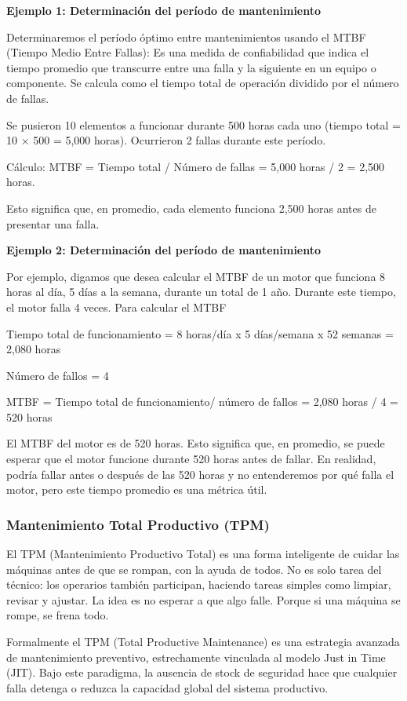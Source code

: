 \documentclass[a4paper,oneside,11pt]{article}
\begin{document}
\begin{enumerate}
    \textbf{Ejemplo 1: Determinación del período de mantenimiento} 
    
    Determinaremos el período óptimo entre mantenimientos usando el MTBF (Tiempo Medio Entre Fallas): Es una medida de confiabilidad que indica el tiempo promedio que transcurre entre una falla y la siguiente en un equipo o componente. Se calcula como el tiempo total de operación dividido por el número de fallas.

    Se pusieron 10 elementos a funcionar durante 500 horas cada uno (tiempo total = 10 × 500 = 5,000 horas). Ocurrieron 2 fallas durante este período.

    Cálculo: MTBF = Tiempo total / Número de fallas = 5,000 horas / 2 = 2,500 horas.

    Esto significa que, en promedio, cada elemento funciona 2,500 horas antes de presentar una falla.

    \textbf{Ejemplo 2: Determinación del período de mantenimiento} 
    
    Por ejemplo, digamos que desea calcular el MTBF de un motor que funciona 8 horas al día, 5 días a la semana, durante un total de 1 año. Durante este tiempo, el motor falla 4 veces. Para calcular el MTBF
    
    Tiempo total de funcionamiento = 8 horas/día x 5 días/semana x 52 semanas = 2,080 horas
    
    Número de fallos = 4
    
    MTBF = Tiempo total de funcionamiento/ número de fallos = 2,080 horas / 4 = 520 horas
    
    El MTBF del motor es de 520 horas. Esto significa que, en promedio, se puede esperar que el motor funcione durante 520 horas antes de fallar. En realidad, podría fallar antes o después de las 520 horas y no entenderemos por qué falla el motor, pero este tiempo promedio es una métrica útil.

    \subsubsection{Mantenimiento Total Productivo (TPM)}
    El TPM (Mantenimiento Productivo Total) es una forma inteligente de cuidar las máquinas antes de que se rompan, con la ayuda de todos. No es solo tarea del técnico: los operarios también participan, haciendo tareas simples como limpiar, revisar y ajustar. La idea es no esperar a que algo falle. Porque si una máquina se rompe, se frena todo.

    Formalmente el TPM (Total Productive Maintenance) es una estrategia avanzada de mantenimiento preventivo, estrechamente vinculada al modelo Just in Time (JIT). Bajo este paradigma, la ausencia de stock de seguridad hace que cualquier falla detenga o reduzca la capacidad global del sistema productivo.


\end{enumerate}
\end{document}
